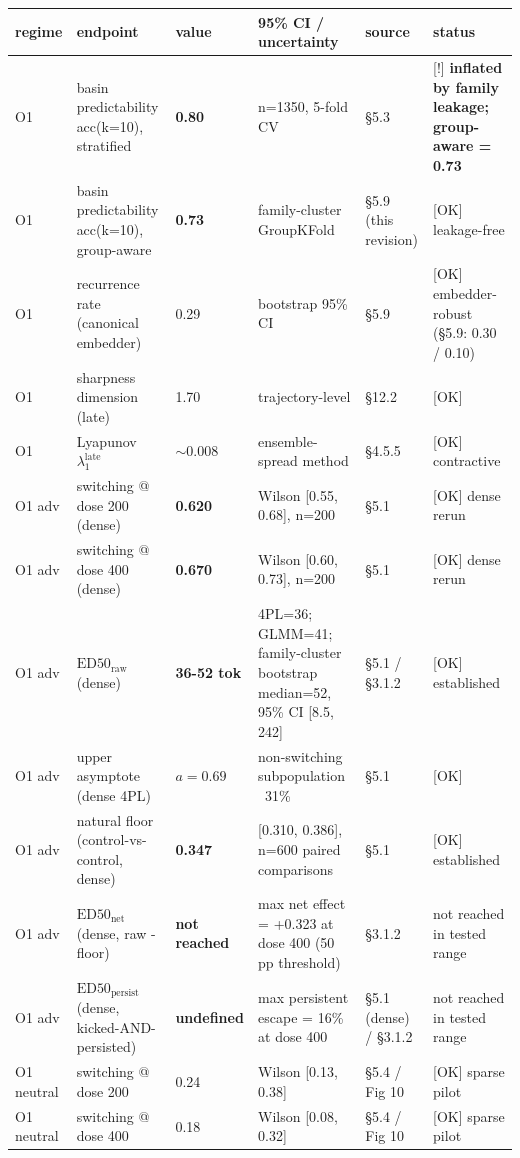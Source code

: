 \documentclass{article}
\theoremstyle{plain}
\theoremstyle{definition}
\begin{document}
\begin{table}[h!]
\centering
\small
\begin{tabularx}{\textwidth}{lYYYYY}
\toprule
regime & endpoint & value & 95\% CI / uncertainty & source & status \\
\midrule
O1 & basin predictability acc(k=10), stratified & \textbf{0.80} & n=1350, 5-fold CV & §5.3 & [!] \textbf{inflated by family leakage; group-aware = 0.73} \\
O1 & basin predictability acc(k=10), group-aware & \textbf{0.73} & family-cluster GroupKFold & §5.9 (this revision) & [OK] leakage-free \\
O1 & recurrence rate (canonical embedder) & 0.29 & bootstrap 95\% CI & §5.9 & [OK] embedder-robust (§5.9: 0.30 / 0.10) \\
O1 & sharpness dimension (late) & 1.70 & trajectory-level & §12.2 & [OK] \\
O1 & Lyapunov $\lambda_1^{\mathrm{late}}$ & $\sim 0.008$ & ensemble-spread method & §4.5.5 & [OK] contractive \\
O1 adv & switching @ dose 200 (dense) & \textbf{0.620} & Wilson [0.55, 0.68], n=200 & §5.1 & [OK] dense rerun \\
O1 adv & switching @ dose 400 (dense) & \textbf{0.670} & Wilson [0.60, 0.73], n=200 & §5.1 & [OK] dense rerun \\
O1 adv & $\mathrm{ED50}_{\mathrm{raw}}$ (dense) & \textbf{36-52 tok} & 4PL=36; GLMM=41; family-cluster bootstrap median=52, 95\% CI [8.5, 242] & §5.1 / §3.1.2 & [OK] established \\
O1 adv & upper asymptote (dense 4PL) & \textbf{$a = 0.69$} & non-switching subpopulation ~31\% & §5.1 & [OK] \\
O1 adv & natural floor (control-vs-control, dense) & \textbf{0.347} & [0.310, 0.386], n=600 paired comparisons & §5.1 & [OK] established \\
O1 adv & $\mathrm{ED50}_{\mathrm{net}}$ (dense, raw - floor) & \textbf{not reached} & max net effect = +0.323 at dose 400 (50 pp threshold) & §3.1.2 & not reached in tested range \\
O1 adv & $\mathrm{ED50}_{\mathrm{persist}}$ (dense, kicked-AND-persisted) & \textbf{undefined} & max persistent escape = 16\% at dose 400 & §5.1 (dense) / §3.1.2 & not reached in tested range \\
O1 neutral & switching @ dose 200 & 0.24 & Wilson [0.13, 0.38] & §5.4 / Fig 10 & [OK] sparse pilot \\
O1 neutral & switching @ dose 400 & 0.18 & Wilson [0.08, 0.32] & §5.4 / Fig 10 & [OK] sparse pilot \\

\end{tabularx}
\end{table}
\end{document}
